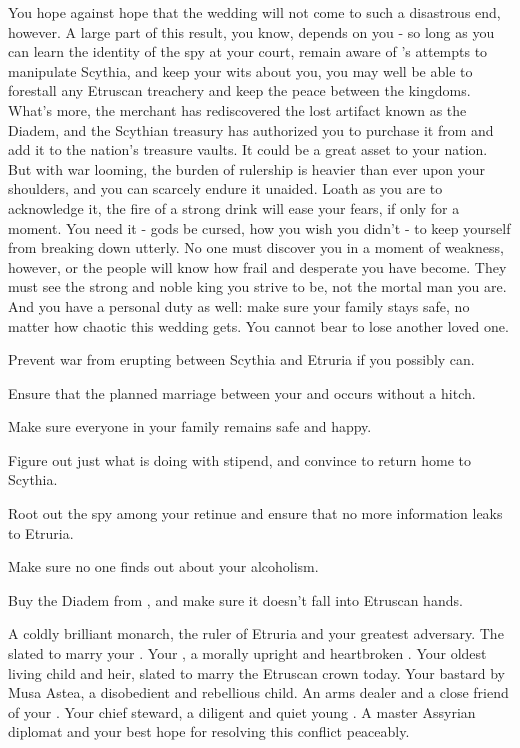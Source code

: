 \documentclass[char]{Kos}
\begin{document}
    You hope against hope that the wedding will not come to such a disastrous end, however. A large part of this result, you know, depends on you - so long as you can learn the identity of the spy at your court, remain aware of \cEtruriaKing{}'s attempts to manipulate Scythia, and keep your wits about you, you may well be able to forestall any Etruscan treachery and keep the peace between the kingdoms. What's more, the merchant \cMerchant{} has rediscovered the lost artifact known as the Diadem, and the Scythian treasury has authorized you to purchase it from \cMerchant{\them} and add it to the nation's treasure vaults. It could be a great asset to your nation. But with war looming, the burden of rulership is heavier than ever upon your shoulders, and you can scarcely endure it unaided. Loath as you are to acknowledge it, the fire of a strong drink will ease your fears, if only for a moment. You need it - gods be cursed, how you wish you didn't - to keep yourself from breaking down utterly. No one must discover you in a moment of weakness, however, or the people will know how frail and desperate you have become. They must see the strong and noble king you strive to be, not the mortal man you are. And you have a personal duty as well: make sure your family stays safe, no matter how chaotic this wedding gets. You cannot bear to lose another loved one.

\begin{itemz}[Goals]
\item Prevent war from erupting between Scythia and Etruria if you possibly can.
\item Ensure that the planned marriage between your \cBride{\offspring} and \cGroom{} occurs without a hitch.
\item Make sure everyone in your family remains safe and happy.
\item Figure out just what \cWard{} is doing with \cWard{\their} stipend, and convince \cWard{\them} to return home to Scythia.
\item Root out the spy among your retinue and ensure that no more information leaks to Etruria.
\item Make sure no one finds out about your alcoholism.
\item Buy the Diadem from \cMerchant{}, and make sure it doesn't fall into Etruscan hands.
\end{itemz}

\begin{contacts}
\contact{\cEtruriaKing{}} A coldly brilliant monarch, the ruler of Etruria and your greatest adversary.
\contact{\cGroom{}} The \cGroom{\human} slated to marry your \cBride{\offspring}.
\contact{\cScythiaQueen{}} Your \cScythiaQueen{\spouse}, a morally upright and heartbroken \cScythiaQueen{\human}.
\contact{\cBride{}} Your oldest living child and heir, slated to marry the Etruscan crown  today.
\contact{\cWard{}} Your bastard \cWard{\offspring} by Musa Astea, a disobedient and rebellious child.
\contact{\cArmsDealer{}} An arms dealer and a close friend of your \cScythiaQueen{\spouse}.
\contact{\cButler{}} Your chief steward, a diligent and quiet young \cButler{\human}.
 A master Assyrian diplomat and your best hope for resolving this conflict peaceably.
\end{contacts}
\end{document}
